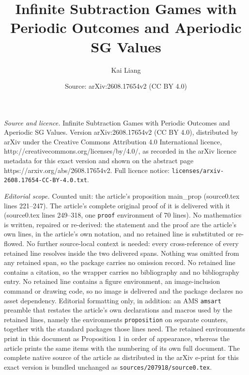 \documentclass[10pt,a4paper]{amsart}
\title{Infinite Subtraction Games with Periodic Outcomes and Aperiodic SG Values}
\author{Kai Liang}
\date{Source: arXiv:2608.17654v2 (CC BY 4.0)}
\begin{document}
\maketitle

\noindent\emph{Source and licence.} Infinite Subtraction Games with Periodic Outcomes and Aperiodic SG Values. Version arXiv:2608.17654v2 (CC BY 4.0), distributed by arXiv under the Creative Commons Attribution 4.0 International licence, http://creativecommons.org/licenses/by/4.0/, as recorded in the arXiv licence metadata for this exact version and shown on the abstract page https://arxiv.org/abs/2608.17654v2. Full licence notice: \texttt{licenses/arxiv-2608.17654-CC-BY-4.0.txt}.\par\smallskip

\noindent\textit{Editorial scope.} Counted unit: the article's proposition main\_prop (source0.tex lines 221--247). The article's complete original proof of it is delivered with it (source0.tex lines 249--318, one \texttt{proof} environment of 70 lines). No mathematics is written, repaired or re-derived: the statement and the proof are the article's own lines, in the article's own notation, and no retained line is substituted or re-flowed.  No further source-local context is needed: every cross-reference of every retained line resolves inside the two delivered spans.  Nothing was omitted from any retained span, so the package carries no omission record.  No retained line contains a citation, so the wrapper carries no bibliography and no bibliography entry.  No retained line contains a figure environment, an image-inclusion command or drawing code, so no image is delivered and the package declares no asset dependency.  Editorial formatting only, in addition: an AMS \texttt{amsart} preamble that restates the article's own declarations and macros used by the retained lines, namely the environments \texttt{proposition} on separate counters, together with the standard packages those lines need.  The retained environments print in this document as Proposition 1 in order of appearance, whereas the article prints the same items with the numbering of its own full document.  The complete native source of the article as distributed in the arXiv e-print for this exact version is bundled unchanged as \texttt{sources/207918/source0.tex}.
\end{document}
